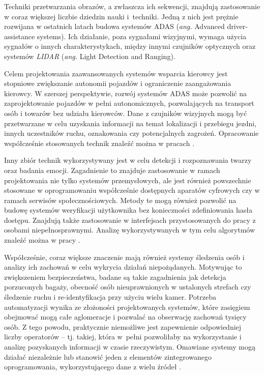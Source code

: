 Techniki przetwarzania obrazów, a zwłaszcza ich sekwencji, znajdują zastosowanie w coraz większej liczbie dziedzin nauki i~techniki.
Jedną z nich jest prężnie rozwijana w ostatnich latach budowa systemów ADAS (\emph{ang.} Advanced driver-assistance systems).
Ich działanie, poza sygnałami wizyjnymi, wymaga użycia sygnałów o innych charakterystykach, między innymi czujników optycznych oraz systemów \emph{LIDAR} (\emph{ang.} Light Detection and Ranging). 

Celem projektowania zaawansowanych systemów wsparcia kierowcy jest stopniowe zwiększanie autonomii pojazdów i ograniczenie zaangażowania kierowcy. W szerszej perspektywie, rozwój systemów ADAS może pozwolić na zaprojektowanie pojazdów w pełni autonomicznych, pozwalających na transport osób i towarów bez udziału kierowców.
Dane z czujników wizyjnych mogą być przetwarzane w celu uzyskania informacji na temat lokalizacji i przebiegu jezdni, innych uczestników ruchu, oznakowania czy potencjalnych zagrożeń. 
Opracowanie współcześnie stosowanych technik znaleźć można w pracach \cite{Bengler2014,Velez2017}.

Inny zbiór technik wykorzystywany jest w celu detekcji i rozpoznawania twarzy oraz badania emocji.
Zagadnienie to znajduje zastosowanie w ramach projektowania nie tylko systemów przemysłowych, ale jest również powszechnie stosowane w oprogramowaniu współcześnie dostępnych aparatów cyfrowych czy w ramach serwisów społecznościowych. 
Metody te mogą również pozwolić na budowę systemów weryfikacji użytkownika bez konieczności zdefiniowania hasła dostępu. 
Znajdują także zastosowanie w interfejsach przystosowanych do pracy z osobami niepełnosprawnymi.
Analizę wykorzystywanych w tym celu algorytmów znaleźć można w pracy \cite{Anil2016}.

Współcześnie, coraz większe znaczenie mają również systemy śledzenia osób i analizy ich zachowań w celu wykrycia działań niepożądanych.
Motywując to zwiększeniem bezpieczeństwa, badane są takie zagadnienia jak detekcja porzuconych bagaży, obecność osób nieuprawnionych w ustalonych strefach czy śledzenie ruchu i re-identyfikacja przy użyciu wielu kamer.
Potrzeba automatyzacji wynika ze złożoności projektowanych systemów, które zasięgiem obejmować mogą całe aglomeracje i pozwalać na obserwację zachowań tysięcy osób. 
Z tego powodu, praktycznie niemożliwe jest zapewnienie odpowiedniej liczby operatorów -- tj. takiej, która w~pełni pozwoliłaby na wykorzystanie i analizę pozyskanych informacji w czasie rzeczywistym. 
Omawiane systemy mogą działać niezależnie lub stanowić jeden z elementów zintegrowanego oprogramowania, wykorzystującego dane z wielu źródeł \cite{Sriram2016,Hussain2016,Gouo2015}.


